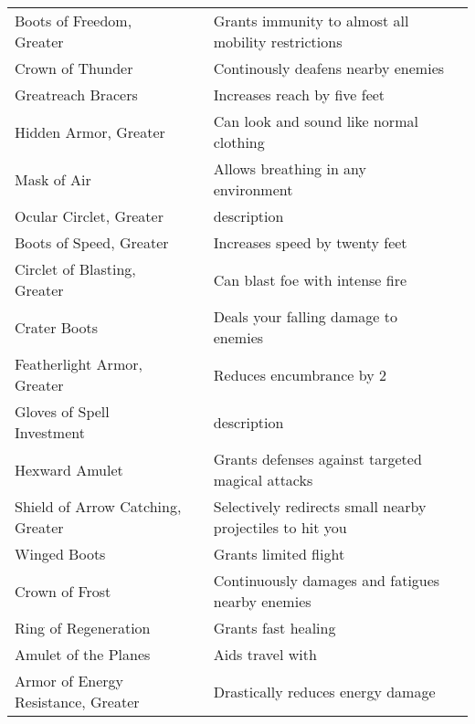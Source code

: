 \begin{longtabuwrapper}
\begin{longtabu}{l l X l}
Boots of Freedom, Greater &  & Grants immunity to almost all mobility restrictions & \pageref{item:Boots of Freedom, Greater} \\
Crown of Thunder &  & Continously deafens nearby enemies & \pageref{item:Crown of Thunder} \\
Greatreach Bracers &  & Increases reach by five feet & \pageref{item:Greatreach Bracers} \\
Hidden Armor, Greater &  & Can look and sound like normal clothing & \pageref{item:Hidden Armor, Greater} \\
Mask of Air &  & Allows breathing in any environment & \pageref{item:Mask of Air} \\
Ocular Circlet, Greater &  & description & \pageref{item:Ocular Circlet, Greater} \\
Boots of Speed, Greater &  & Increases speed by twenty feet & \pageref{item:Boots of Speed, Greater} \\
Circlet of Blasting, Greater &  & Can blast foe with intense fire & \pageref{item:Circlet of Blasting, Greater} \\
Crater Boots &  & Deals your falling damage to enemies & \pageref{item:Crater Boots} \\
Featherlight Armor, Greater &  & Reduces encumbrance by 2 & \pageref{item:Featherlight Armor, Greater} \\
Gloves of Spell Investment &  & description & \pageref{item:Gloves of Spell Investment} \\
Hexward Amulet &  & Grants  defenses against targeted magical attacks & \pageref{item:Hexward Amulet} \\
Shield of Arrow Catching, Greater &  & Selectively redirects small nearby projectiles to hit you & \pageref{item:Shield of Arrow Catching, Greater} \\
Winged Boots &  & Grants limited flight & \pageref{item:Winged Boots} \\
Crown of Frost &  & Continuously damages and fatigues nearby enemies & \pageref{item:Crown of Frost} \\
Ring of Regeneration &  & Grants fast healing & \pageref{item:Ring of Regeneration} \\
Amulet of the Planes &  & Aids travel with  & \pageref{item:Amulet of the Planes} \\
Armor of Energy Resistance, Greater &  & Drastically reduces energy damage & \pageref{item:Armor of Energy Resistance, Greater} \\

\end{longtabu}
\end{longtabuwrapper}
